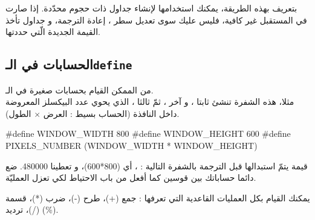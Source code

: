 بتعريف
بهذه الطريقة، يمكنك استخدامها لإنشاء جداول ذات حجوم محدّدة. إذا صارت في المستقبل غير كافية، فليس عليك سوى تعديل سطر
،
إعادة الترجمة، و جداول
تأخذ القيمة الجديدة الّتي حددتها.

\subsection{الحسابات في الـ\texttt{define}}
من الممكن القيام بحسابات صغيرة في الـ.\\
مثلا، هذه الشفرة تنشئ ثابتا
،
و آخر
،
ثمّ ثالثا
،
الذي يحوي عدد البيكسلز المعروضة داخل النافذة (الحساب بسيط : العرض $\times$ الطول).
\begin{Csource}
#define WINDOW_WIDTH 800
#define WINDOW_HEIGHT 600
#define PIXELS_NUMBER (WINDOW_WIDTH * WINDOW_HEIGHT)
\end{Csource}
قيمة
يتمّ استبدالها قبل الترجمة بالشفرة التالية :
،
أي (800*600)، و تعطينا 480000.
ضع دائما حساباتك بين قوسين كما أفعل من باب الاحتياط لكي تعزل العمليّة.

يمكنك القيام بكل العمليات القاعدية التي تعرفها : جمع (+)، طرح (-)، ضرب (*)، قسمة (/)، ترديد (\%).
